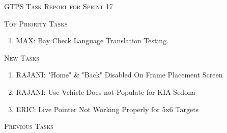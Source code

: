 


\begin{center}

\Large

\textsc{GTPS Task Report for Sprint 17}\

\normalsize \DTMnow

\end{center}\vspace{1.5cm}
\large

\textsc{{Top Priority Tasks}}

\normalsize
\begin{enumerate}[leftmargin=!,labelindent=5pt,itemindent=-35pt]
\item {} MAX: Bay Check Language Translation Testing.
\end{enumerate}\vspace{.5cm}
\large

\textsc{{New Tasks}}

\normalsize
\begin{enumerate}[leftmargin=!,labelindent=5pt,itemindent=-35pt]
\item {} RAJANI: "Home" \& "Back" Disabled On Frame Placement Screen
\item {} RAJANI: Use Vehicle Does not Populate for KIA Sedona
\item {} ERIC: Live Pointer Not Working Properly for 5x6 Targets
\end{enumerate}\vspace{.5cm}
\large

\textsc{{Previous Tasks}}

